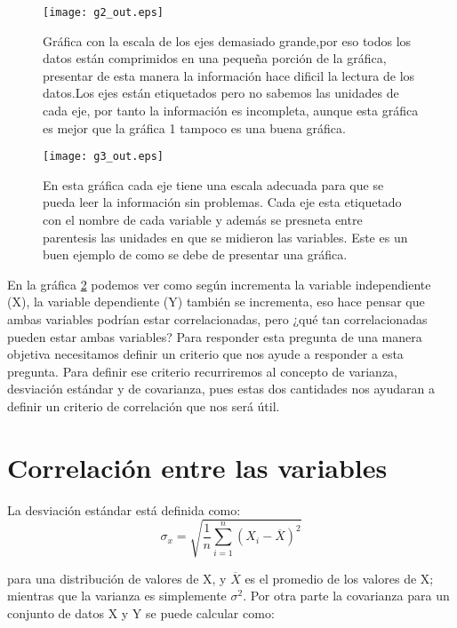 \documentclass[12pt,letterpaper]{report}
\begin{document}
\begin{figure}
\begin{center}
\texttt{[image: g2\_out.eps]} 
\caption{Gráfica con la escala de los ejes demasiado grande,por eso todos los datos están comprimidos en una pequeña porción de la gráfica, presentar de esta manera la información hace dificil la lectura de los datos.Los ejes están  etiquetados pero no sabemos las unidades de cada eje, por tanto la información es incompleta, aunque esta gráfica es mejor que la gráfica 1 tampoco es una buena gráfica.}\label{g2}
\end{center}
\end{figure}


\begin{figure}
\begin{center}
\texttt{[image: g3\_out.eps]} 
\caption{En esta gráfica cada eje tiene una escala adecuada para que se pueda leer la información sin problemas. Cada eje esta etiquetado con el nombre de cada variable y además se presneta entre parentesis las unidades  en que se midieron las variables. Este es un buen ejemplo de como se debe de presentar una gráfica.}\label{g3}
\end{center}
\end{figure}

En la gráfica \ref{g3} podemos ver como según incrementa la variable independiente (X), la variable dependiente (Y) también se incrementa, eso hace pensar que ambas variables podrían estar correlacionadas, pero ¿qué tan correlacionadas pueden estar ambas variables? Para responder esta pregunta de una manera objetiva necesitamos definir un criterio que nos ayude a responder a esta pregunta. Para definir ese criterio recurriremos al concepto de varianza, desviación estándar  y  de covarianza, pues estas dos cantidades nos ayudaran a definir un criterio de correlación que nos será útil.\\

\section{Correlación entre las variables}


La desviación  estándar   está definida como:
\begin{equation}
 \sigma_{x} = \sqrt{\frac{1}{n}\sum_{i=1}^{n}(X_{i}- \overline{X})^{2}}
 \end{equation} 
 
para una distribución de valores  de X, y $\overline{X} $ es el promedio de los valores de X; mientras que la varianza es simplemente $\sigma^{2} $. Por otra parte la covarianza para un conjunto de datos X y Y  se puede calcular como:
\end{document}
